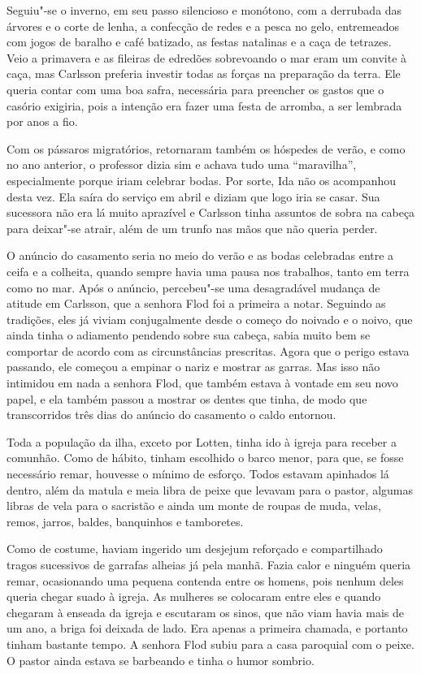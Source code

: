 Seguiu"-se o inverno, em seu passo silencioso e monótono, com a derrubada das árvores e o corte de lenha, 
a confecção de redes e a pesca no gelo, entremeados com jogos de baralho e
café batizado, as festas natalinas e a caça de tetrazes. Veio a
primavera e as fileiras de edredões sobrevoando o mar eram um convite à caça, mas
Carlsson preferia investir todas as forças na preparação da terra. Ele queria
contar com uma boa safra, necessária para preencher os gastos que o casório
exigiria, pois a intenção era fazer uma festa de arromba, a ser lembrada
por anos a fio.

Com os pássaros migratórios, retornaram também os hóspedes de verão, e como no
ano anterior, o professor dizia sim e achava tudo uma ``maravilha'', especialmente
porque iriam celebrar bodas. Por sorte, Ida não os acompanhou desta vez. Ela saíra do
serviço em abril e diziam que logo iria se casar. Sua sucessora não era lá muito
aprazível e Carlsson tinha assuntos de sobra na cabeça para deixar"-se atrair,
além de um trunfo nas mãos que não queria perder.

O anúncio do casamento seria no meio do verão e as bodas celebradas entre a
ceifa e a colheita, quando sempre havia uma pausa nos trabalhos, tanto em
terra como no mar. Após o anúncio, percebeu"-se uma desagradável mudança de
atitude em Carlsson, que a senhora Flod foi a primeira a notar. Seguindo as
tradições, eles já viviam conjugalmente desde o começo do noivado e o noivo,
que ainda tinha o adiamento pendendo sobre sua cabeça, sabia muito bem se
comportar de acordo com as circunstâncias prescritas. Agora que o perigo estava
passando, ele começou a empinar o nariz e mostrar as garras. Mas isso não
intimidou em nada a senhora Flod, que também estava à vontade em seu novo papel,
e ela também passou a mostrar os dentes que tinha, de modo que transcorridos 
três dias do anúncio do casamento o caldo entornou. 

Toda a população da ilha, exceto por
Lotten, tinha ido à igreja para receber a comunhão. Como de hábito, tinham
escolhido o barco menor, para que, se fosse necessário remar,
houvesse o mínimo de esforço. Todos estavam apinhados lá dentro, além
da matula e meia libra de peixe que levavam para o pastor, algumas libras de vela
para o sacristão e ainda um monte de roupas de muda, velas, remos, jarros,
baldes, banquinhos e tamboretes.

Como de costume, haviam ingerido um desjejum reforçado e compartilhado tragos
sucessivos de garrafas alheias já pela manhã. Fazia calor e ninguém queria
remar, ocasionando uma pequena contenda entre os homens, pois nenhum deles queria
chegar suado à igreja. As mulheres se colocaram entre eles e quando chegaram à
enseada da igreja e escutaram os sinos, que não viam havia mais de um ano,
a briga foi deixada de lado. Era apenas a primeira chamada, e portanto tinham
bastante tempo. A senhora Flod subiu para a casa paroquial com o peixe. O pastor
ainda estava se barbeando e tinha o humor sombrio.

